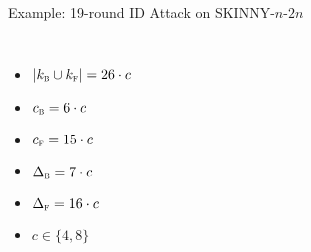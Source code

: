 \documentclass[table,aspectratio=169]{beamer}
\newcommand{\In}{_{\textsc{b}}} %
\newcommand{\Out}{_{\textsc{f}}} %
\newcommand{\cs}{c} %
\begin{document}
\begin{frame}{Example: 19-round ID Attack on SKINNY-$n$-$2n$}
\vspace{-0.6cm}
\begin{columns}
\vspace{0.3cm}
\begin{itemize}
  \small
  \item $|k\In \cup k\Out| = 26\cdot \cs$
  \item $c\In = 6\cdot \cs$
  \item $c\Out = 15\cdot \cs$
  \item $\Delta\In = 7\cdot \cs$
  \item $\Delta\Out = 16\cdot \cs$
  \item $\cs \in \{4, 8\}$
\end{itemize}
\begin{figure}
\centering
\resizebox{0.95\textwidth}{!}{
\begin{tikzpicture}

\SkinnyInit{}{}{}{} %


\end{tikzpicture}}
\end{figure}
\end{columns}
\end{frame}
\end{document}
